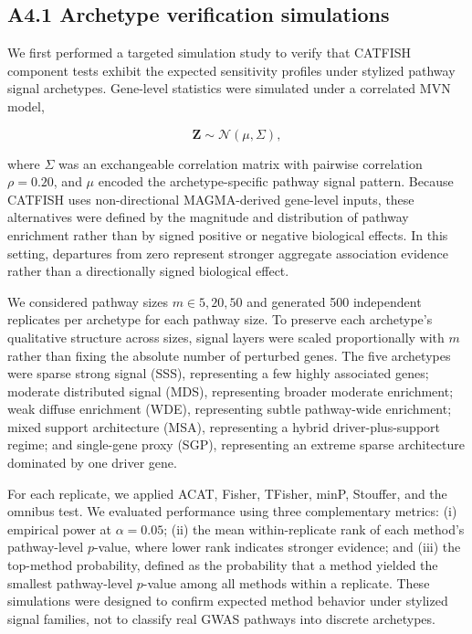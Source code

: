 \documentclass[unnumsec,webpdf,contemporary,large]{oup-authoring-template}%
\theoremstyle{thmstyleone}%
\theoremstyle{thmstyletwo}%
\theoremstyle{thmstylethree}%
\begin{document}
\begin{appendices}
\subsection{A4.1 Archetype verification simulations}

We first performed a targeted simulation study to verify that CATFISH component tests exhibit the expected sensitivity profiles under stylized pathway signal archetypes. Gene-level statistics were simulated under a correlated MVN model,

\[
\mathbf{Z} \sim \mathcal{N}(\mu,\Sigma),
\]

where $\Sigma$ was an exchangeable correlation matrix with pairwise correlation $\rho=0.20$, and $\mu$ encoded the archetype-specific pathway signal pattern. Because CATFISH uses non-directional MAGMA-derived gene-level inputs, these alternatives were defined by the magnitude and distribution of pathway enrichment rather than by signed positive or negative biological effects. In this setting, departures from zero represent stronger aggregate association evidence rather than a directionally signed biological effect.

We considered pathway sizes $m \in {5,20,50}$ and generated 500 independent replicates per archetype for each pathway size. To preserve each archetype's qualitative structure across sizes, signal layers were scaled proportionally with $m$ rather than fixing the absolute number of perturbed genes. The five archetypes were sparse strong signal (SSS), representing a few highly associated genes; moderate distributed signal (MDS), representing broader moderate enrichment; weak diffuse enrichment (WDE), representing subtle pathway-wide enrichment; mixed support architecture (MSA), representing a hybrid driver-plus-support regime; and single-gene proxy (SGP), representing an extreme sparse architecture dominated by one driver gene.

For each replicate, we applied ACAT, Fisher, TFisher, minP, Stouffer, and the omnibus test. We evaluated performance using three complementary metrics: (i) empirical power at $\alpha=0.05$; (ii) the mean within-replicate rank of each method's pathway-level $p$-value, where lower rank indicates stronger evidence; and (iii) the top-method probability, defined as the probability that a method yielded the smallest pathway-level $p$-value among all methods within a replicate. These simulations were designed to confirm expected method behavior under stylized signal families, not to classify real GWAS pathways into discrete archetypes.


\end{appendices}
\end{document}
